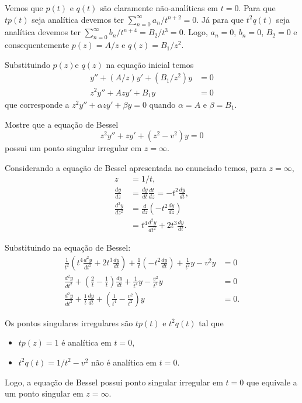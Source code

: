 \documentclass[a4paper,12pt, leqno, answers]{exam}
\begin{document}
\begin{questions}
\begin{solution}
        Vemos que $p(t)$ e $q(t)$ s\~{a}o claramente n\~{a}o-anal\'{i}ticas em $t=0$. Para que $tp(t)$ seja anal\'{i}tica devemos ter $\sum_{n = 0}^\infty a_n / t^{n + 2} = 0$. J\'{a} para que $t^{2}q(t)$ seja anal\'{i}tica devemos ter $\sum_{n = 0}^\infty b_n / t^{n + 4} = B_2 / t^3 = 0$. Logo, $a_n = 0$, $b_n = 0$, $B_2 = 0$ e consequentemente $p(z) = A / z$ e $q(z) = B_1 / z^2$.

        Substituindo $p(z)$e $q(z)$ na equa\c{c}\~{a}o inicial temos
        \begin{align*}
            y'' + \left( A / z \right) y' + \left( B_1 /z^2 \right) y &= 0 \\
            z^2 y'' + A z y' + B_1 y &= 0
        \end{align*}
        que corresponde a $z^2 y'' + \alpha z y' + \beta y = 0$ quando $\alpha = A$ e $\beta = B_1$.
    \end{solution}

    \question Mostre que a equa\c{c}\~{a}o de Bessel
    \[
    z^2 y'' + z y' + \left( z^2 - v^2 \right) y = 0
    \]
    possui um ponto singular irregular em $z = \infty$.
    \begin{solution}
        Considerando a equa\c{c}\~{a}o de Bessel apresentada no enunciado temos, para $z = \infty$,
        \begin{align*}
            z &= 1 / t, \\
            \frac{d y}{d z} &= \frac{d y}{d t} \frac{d t}{d z} = -t^2 \frac{d y}{d t}, \\
            \frac{d^2 y}{d z^2} &= \frac{d}{d z} \left( - t^2 \frac{d y}{d z} \right) \\
            &= t^4 \frac{d^2 y}{d t^2} + 2 t^3 \frac{d y}{d t}.
        \end{align*}

        Substituindo na equa\c{c}\~{a}o de Bessel:
        \begin{align*}
            \frac{1}{t^2} \left( t^4 \frac{d^2 y}{d t^2} + 2 t^3 \frac{d y}{d t} \right) + \frac{1}{t} \left( - t^2 \frac{d y}{d t} \right) + \frac{1}{t^2} y - v^2 y &= 0 \\
            \frac{d^2 y}{d t^2} + \left( \frac{2}{t} - \frac{1}{t} \right) \frac{d y}{d t} + \frac{1}{t^4} y - \frac{v^2}{t^2} y &= 0 \\
            \frac{d^2 y}{d t^2} + \frac{1}{t} \frac{d y}{d t} + \left( \frac{1}{t^4} - \frac{v^2}{t^2} \right) y &= 0.
        \end{align*}

        Os pontos singulares irregulares s\~{a}o $t p(t)$ e $t^2 q(t)$ tal que
        \begin{itemize}
            \item $t p(z) = 1$ \'{e} anal\'{i}tica em $t = 0$,
            \item $t^2 q(t) = 1 / t^2 - v^2$ n\~{a}o \'{e} anal\'{i}tica em $t = 0$.
        \end{itemize}
        Logo, a equa\c{c}\~{a}o de Bessel possui ponto singular irregular em $t = 0$ que equivale a um ponto singular em $z = \infty$.
    \end{solution}


\end{questions}
\end{document}
